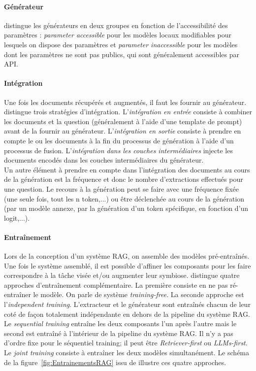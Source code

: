         \paragraph{Générateur} \cite{fan_survey_2024} distingue les générateurs en deux groupes en fonction de l'accessibilité des paramètres : \textit{parameter accessible} pour les modèles locaux modifiables pour lesquels on dispose des paramètres et \textit{parameter inaccessible} pour les modèles dont les paramètres ne sont pas publics, qui sont généralement accessibles par API.

        \paragraph{Intégration} Une fois les documents récupérés et augmentés, il faut les fournir au générateur. \cite{fan_survey_2024} distingue trois stratégies d'intégration. L'\textit{intégration en entrée} consiste à combiner les documents et la question (généralement à l'aide d'une template de prompt) avant de la fournir au générateur. L'\textit{intégration en sortie} consiste à prendre en compte le ou les documents à la fin du processus de génération à l'aide d'un processus de fusion. L'\textit{intégration dans les couches intermédiaires} injecte les documents encodés dans les couches intermédiaires du générateur.\\
        Un autre élément à prendre en compte dans l'intégration des documents au cours de la génération est la fréquence et donc le nombre d'extractions effectués pour une question. Le recours à la génération peut  se faire avec une fréquence fixée (une seule fois, tout les n token,...) ou être déclenchée au cours de la génération (par un modèle annexe, par la génération d'un token spécifique, en fonction d'un logit,...).

        \paragraph{Entraînement} Lors de la conception d'un système RAG, on assemble des modèles pré-entraînés. Une fois le système assemblé, il est possible d'affiner les composants pour les faire correspondre à la tâche visée et/ou augmenter leur symbiose. \cite{fan_survey_2024} distingue quatre approches d'entraînement complémentaire. La première consiste en ne pas ré-entraîner le modèle. On parle de système \textit{training-free}. La seconde approche est l'\textit{independent training}. L'extracteur et le générateur sont entraînés chacun de leur coté de façon totalement indépendante en dehors de la pipeline du système RAG.  Le \textit{sequential training} entraîne les deux composants l'un après l'autre mais le second est entraîné à l'intérieur de la pipeline du système RAG. Il n'y a pas d'ordre fixe pour le séquentiel training; il peut être \textit{Retriever-first} ou \textit{LLMs-first}. Le \textit{joint training} consiste à entraîner les deux modèles simultanément. Le schéma de la figure~\ref{fig:EntrainementsRAG} issu de \cite{fan_survey_2024} illustre ces quatre approches.
        
